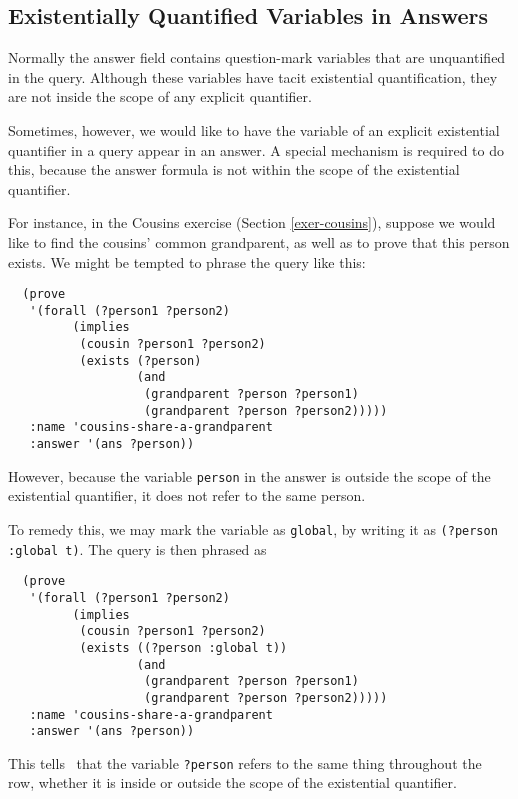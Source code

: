 \subsection{Existentially Quantified Variables in Answers}
\label{subsec-existentials-in-answers}
Normally the answer field contains question-mark variables that are
unquantified in the query.  Although these variables have tacit
existential quantification, they are not inside the scope of any
explicit quantifier.

Sometimes, however, we would like to have the variable of an explicit
existential quantifier in a query appear in an answer.  A special
mechanism is required to do this, because the answer formula is not
within the scope of the existential quantifier.

For instance, in the Cousins exercise (Section \ref{exer-cousins}),
suppose we would like to find the cousins' common grandparent, as well
as to prove that this person exists.  We might be tempted to phrase
the query like this:
\begin{verbatim}
  (prove
   '(forall (?person1 ?person2)
         (implies
          (cousin ?person1 ?person2)
          (exists (?person)
                  (and
                   (grandparent ?person ?person1)
                   (grandparent ?person ?person2)))))
   :name 'cousins-share-a-grandparent
   :answer '(ans ?person))
\end{verbatim}
However, because the variable {\tt person} in the answer is outside
the scope of the existential quantifier, it does not refer to the same
person.

To remedy this, we may mark the variable as {\tt global}, by writing
it as \verb'(?person :global t)'.  The query is then phrased as
\begin{verbatim}
  (prove
   '(forall (?person1 ?person2)
         (implies
          (cousin ?person1 ?person2)
          (exists ((?person :global t))
                  (and
                   (grandparent ?person ?person1)
                   (grandparent ?person ?person2)))))
   :name 'cousins-share-a-grandparent
   :answer '(ans ?person))
\end{verbatim}
This tells \snark\  that the variable {\tt ?person} refers to the same
thing throughout the row, whether it is inside or outside the scope of
the existential quantifier.

